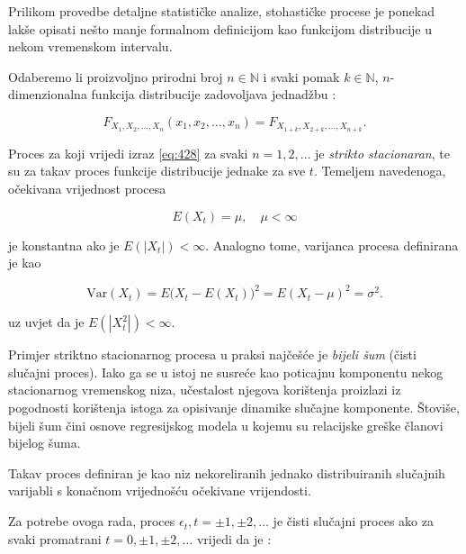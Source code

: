 \documentclass[a4paper,12pt,oneside]{memoir}
\begin{document}
                    Prilikom provedbe detaljne statističke analize, stohastičke procese je ponekad lakše opisati nešto manje formalnom definicijom kao funkcijom distribucije u nekom vremenskom intervalu.

                    Odaberemo li proizvoljno prirodni broj $n\in \mathbb{N}$ i svaki pomak $k\in \mathbb{N}$, $n$-dimenzionalna funkcija distribucije zadovoljava jednadžbu \cite{Bahovec}:

                    \begin{equation}
                        F_{X_1,X_2,\ldots,X_n}(x_1,x_2,\ldots,x_n)=F_{X_{1+k},X_{2+k},\ldots,X_{n+k}}.
                        \label{eq:428}
                    \end{equation}

                    Proces za koji vrijedi izraz \eqref{eq:428} za svaki $n=1,2,\ldots$ je \textit{strikto stacionaran}, te su za takav proces funkcije distribucije jednake za sve $t$. Temeljem navedenoga, očekivana vrijednost procesa

                    \begin{equation}
                        E(X_t)=\mu, \quad \mu < \infty
                    \end{equation}

                    je konstantna ako je $E(|X_t|)<\infty$. Analogno tome, varijanca procesa definirana je kao

                    \begin{equation}
                        \mathrm{Var}(X_t)=E\big(X_t-E(X_t)\big)^2=E(X_t-\mu)^2=\sigma^2.
                    \end{equation}

                    uz uvjet da je $E(|X_t^2|)<\infty$.

                    Primjer striktno stacionarnog procesa u praksi najčešće je \textit{bijeli šum} (čisti slučajni proces). Iako ga se u istoj ne susreće kao poticajnu komponentu nekog stacionarnog vremenskog niza, učestalost njegova korištenja proizlazi iz pogodnosti korištenja istoga za opisivanje dinamike slučajne komponente. Štoviše, bijeli šum čini osnove regresijskog modela u kojemu su relacijske greške članovi bijelog šuma.
                    
                    Takav proces definiran je kao niz nekoreliranih jednako distribuiranih slučajnih varijabli s konačnom vrijednošću očekivane vrijendosti.

                    Za potrebe ovoga rada, proces ${\epsilon_t, t=\pm 1, \pm 2, \ldots}$ je čisti slučajni proces ako za svaki promatrani $t=0,\pm 1, \pm 2,\ldots$ vrijedi da je \cite{Bahovec}:
\end{document}
